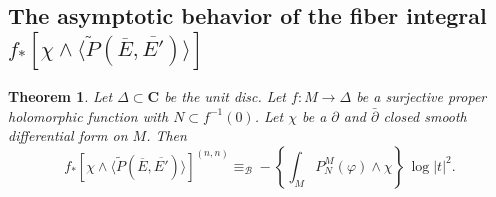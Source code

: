 \documentclass[amscd, leqno]{amsart}
\theoremstyle{plain}
\newtheorem{theorem}{Theorem}[section]
\theoremstyle{definition}
\theoremstyle{remark}
\begin{document}
\subsection
{The asymptotic behavior of the fiber integral $f_{*}[\chi\wedge \langle \widetilde{P}(\overline{E},\overline{E'})\rangle ]$}
\label{sect:6.4}
\par


\begin{theorem}
\label{thm:pusf:forward:Bott:Chern}
Let $\varDelta \subset {\mathbf C}$ be the unit disc. Let $f \colon M \to \varDelta$ be a surjective proper holomorphic function with 
$N \subset f^{-1}(0)$. Let $\chi$ be a $\partial$ and $\bar{\partial}$ closed smooth differential form on $M$. 
Then 
$$
f_{*}[\chi\wedge \langle \widetilde{P}(\overline{E},\overline{E'}) \rangle]^{(n,n)}
\equiv_{\mathcal B} -\left\{ \int_{M} P^{M}_{N}(\varphi) \wedge \chi \right\}\,\log | t |^{2}.
$$
\end{theorem}
\end{document}
